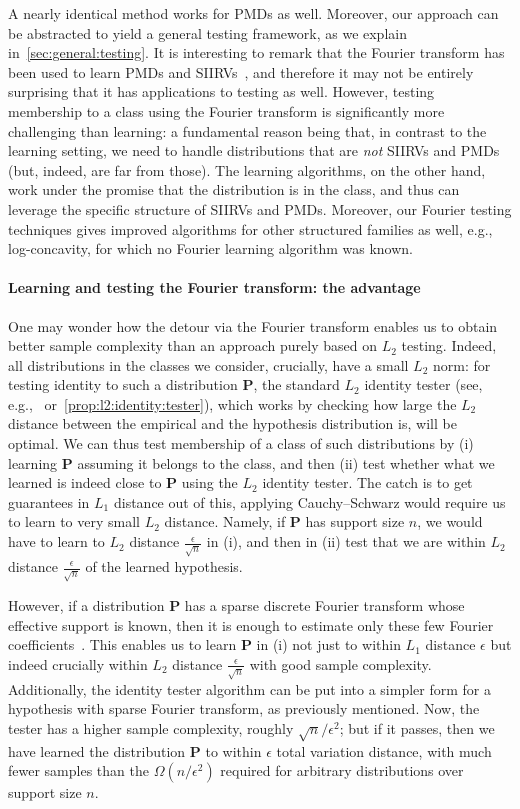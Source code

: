 \documentclass[11pt]{article}
\theoremstyle{definition}
\newcommand{\p}{\mathbf{P}}
\newcommand{\eps}{\epsilon}
\newcommand{\bigOmega}[1]{{\Omega\left( #1 \right)}}
\begin{document}
A nearly identical method works for PMDs as well. Moreover, our approach can be abstracted 
to yield a general testing framework, as we explain in~\cref{sec:general:testing}. It is interesting to
remark that the Fourier transform has been used to learn PMDs and SIIRVs~\cite{DKS:16, DKT15, DKS15b, DDKT16}, and therefore it may not be entirely surprising that it has applications to testing as well. 
However, testing membership to a class using the Fourier transform is significantly more challenging than learning: a fundamental reason being that, in contrast to the learning 
setting, we need to handle distributions that are \emph{not} SIIRVs and PMDs (but, indeed, are far from those). The learning algorithms, on the other hand, work under the promise that the distribution is in the class, and thus can leverage the specific structure of SIIRVs and PMDs. Moreover, our Fourier testing techniques gives
improved algorithms for other structured families as well, e.g., log-concavity, for which no Fourier learning algorithm was known.

\paragraph*{Learning and testing the Fourier transform: the advantage}

One may wonder how the detour via the Fourier transform enables us to obtain better sample complexity than an approach purely based on $L_2$ testing.  Indeed, all distributions in the classes we consider, crucially, have a small $L_2$ norm: for testing identity to such a distribution $\p$, the standard $L_2$ identity tester (see, e.g.,~\cite{CDVV14} or~\cref{prop:l2:identity:tester}), which works by checking how large the $L_2$ distance between the empirical and the hypothesis distribution is, will be optimal. We can thus test membership of a class of such distributions by (i) learning $\p$ assuming it belongs to the class, and then (ii) test whether what we learned is indeed close to $\p$ using the $L_2$ identity tester. The catch is to get guarantees in $L_1$ distance out of this, applying Cauchy--Schwarz would require us to learn to very small $L_2$ distance. Namely, if $\p$ has support size $n$, we would have to learn to $L_2$ distance $\frac{\eps}{\sqrt{n}}$ in (i), and then in (ii) test that we are within $L_2$ distance $\frac{\eps}{\sqrt{n}}$ of the learned hypothesis.

However, if a distribution $\p$ has a sparse discrete Fourier transform whose effective support is known, then it is enough to estimate only these few Fourier coefficients~\cite{DKS:16,DKS15c}. This enables us to learn $\p$ in (i) not just to within $L_1$ distance $\eps$ but indeed crucially within $L_2$ distance $\frac{\eps}{\sqrt{n}}$ with good sample complexity. Additionally, the identity tester algorithm can be put into a simpler form for a hypothesis with sparse Fourier transform, as previously mentioned. Now, the tester has a higher sample complexity, roughly $\sqrt{n}/\eps^2$; but if it passes, then we have learned the distribution $\p$ to within $\eps$ total variation distance, with much fewer samples than the $\bigOmega{n/\eps^2}$ required for arbitrary distributions over support size $n$.
\end{document}
